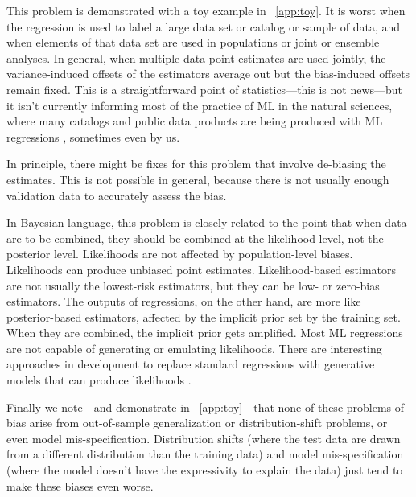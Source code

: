 \documentclass{article}
\begin{document}
This problem is demonstrated with a toy example in \appendixname~\ref{app:toy}.
It is worst when the regression is used to label a large data set or catalog or sample of data,
and when elements of that data set are used in populations or joint or ensemble analyses.
In general, when multiple data point estimates are used jointly, the variance-induced offsets of the estimators average out but the bias-induced offsets remain fixed.
This is a straightforward point of statistics---this is not news---but it isn't currently informing most of the practice of ML in the natural sciences, where many catalogs and public data products are being produced with ML regressions \cite{spectrophotometric, leung, aspgap}, sometimes even by us.

In principle, there might be fixes for this problem that involve de-biasing the estimates.
This is not possible in general, because there is not usually enough validation data to accurately assess the bias.

In Bayesian language, this problem is closely related to the point that when data are to be combined, they should be combined at the likelihood level, not the posterior level.
Likelihoods are not affected by population-level biases.
Likelihoods can produce unbiased point estimates.
Likelihood-based estimators are not usually the lowest-risk estimators, but they can be low- or zero-bias estimators.
The outputs of regressions, on the other hand, are more like posterior-based estimators, affected by the implicit prior set by the training set.
When they are combined, the implicit prior gets amplified.
Most ML regressions are not capable of generating or emulating likelihoods.
There are interesting approaches in development to replace standard regressions with generative models that can produce likelihoods \cite{cannon, likelihood_ratio, biwei}.

Finally we note---and demonstrate in \appendixname~\ref{app:toy}---that none of these problems of bias arise from out-of-sample generalization or distribution-shift problems, or even model mis-specification.
Distribution shifts (where the test data are drawn from a different distribution than the training data) and model mis-specification (where the model doesn't have the expressivity to explain the data) just tend to make these biases even worse.
\end{document}
